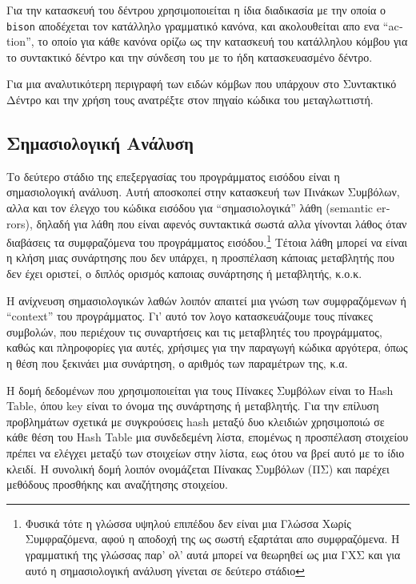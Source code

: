 \documentclass[a4paper,11pt]{article}
\newcommand{\eng}[1]{\foreignlanguage{english}{#1}}
\newcommand{\tech}[1]{\foreignlanguage{english}{\texttt{#1}}}
\begin{document}
Για την κατασκευή του δέντρου χρησιμοποιείται η ίδια διαδικασία με την οποία ο 
\tech{bison} αποδέχεται τον κατάλληλο γραμματικό κανόνα, και ακολουθείται απο
ενα \enquote{\eng{action}}, το οποίο για κάθε κανόνα ορίζω ως την κατασκευή
του κατάλληλου κόμβου για το συντακτικό δέντρο και την σύνδεση του με το ήδη
κατασκευασμένο δέντρο.

Για μια αναλυτικότερη περιγραφή των ειδών κόμβων που υπάρχουν στο Συντακτικό Δέντρο και
την χρήση τους ανατρέξτε στον πηγαίο κώδικα του μεταγλωττιστή. 

\subsection{Σημασιολογική Ανάλυση}
Το δεύτερο στάδιο της επεξεργασίας του προγράμματος εισόδου είναι η σημασιολογική ανάλυση.
Αυτή αποσκοπεί στην κατασκευή των Πινάκων Συμβόλων, αλλα και τον έλεγχο του κώδικα εισόδου
για \enquote{σημασιολογικά} λάθη (\eng{semantic errors}), δηλαδή για λάθη που είναι αφενός 
συντακτικά σωστά αλλα γίνονται λάθος όταν διαβάσεις τα συμφραζόμενα του προγράμματος 
εισόδου.\footnote{
	Φυσικά τότε η γλώσσα υψηλού επιπέδου δεν είναι μια Γλώσσα Χωρίς Συμφραζόμενα,
	αφού η αποδοχή της ως σωστή εξαρτάται απο συμφραζόμενα. Η γραμματική της γλώσσας παρ' ολ'
	αυτά μπορεί να θεωρηθεί ως μια ΓΧΣ και για αυτό η σημασιολογική ανάλυση γίνεται σε
	δεύτερο στάδιο
} Τέτοια λάθη μπορεί να είναι η κλήση μιας συνάρτησης που δεν υπάρχει, η προσπέλαση
κάποιας μεταβλητής που δεν έχει οριστεί, ο διπλός ορισμός καποιας συνάρτησης ή μεταβλητής,
κ.ο.κ.

Η ανίχνευση σημασιολογικών λαθών λοιπόν απαιτεί μια γνώση των συμφραζόμενων ή 
\enquote{\eng{context}} του προγράμματος. Γι' αυτό τον λογο κατασκευάζουμε τους 
πίνακες συμβολών, που περιέχουν τις συναρτήσεις και τις μεταβλητές του προγράμματος,
καθώς και πληροφορίες για αυτές, χρήσιμες για την παραγωγή κώδικα αργότερα,
όπως η θέση που ξεκινάει μια συνάρτηση, ο αριθμός των παραμέτρων της, κ.α. 

Η δομή δεδομένων που χρησιμοποιείται για τους Πίνακες Συμβόλων είναι το
\eng{Hash Table}, όπου \eng{key} είναι το όνομα της συνάρτησης ή μεταβλητής. 
Για την επίλυση προβλημάτων σχετικά με συγκρούσεις \eng{hash} μεταξύ δυο κλειδιών 
χρησιμοποιώ σε κάθε θέση του \eng{Hash Table} μια συνδεδεμένη λίστα, 
επομένως η προσπέλαση στοιχείου πρέπει να ελέγχει μεταξύ των στοιχείων στην λίστα,
εως ότου να βρεί αυτό με το ίδιο κλειδί. Η συνολική δομή λοιπόν ονομάζεται
Πίνακας Συμβόλων (ΠΣ) και παρέχει μεθόδους προσθήκης και αναζήτησης στοιχείου.
\end{document}
